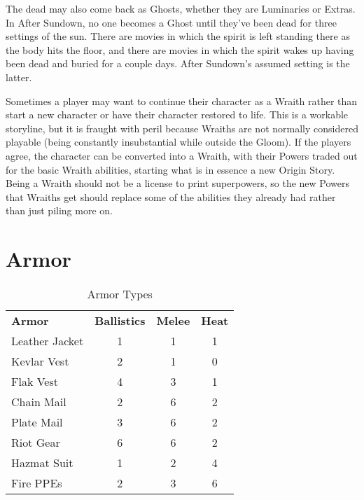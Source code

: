 The dead may also come back as Ghosts, whether they are Luminaries or Extras. In After Sundown, no one becomes a Ghost until they've been dead for three settings of the sun. There are movies in which the spirit is left standing there as the body hits the floor, and there are movies in which the spirit wakes up having been dead and buried for a couple days. After Sundown's assumed setting is the latter.

Sometimes a player may want to continue their character as a Wraith rather than start a new character or have their character restored to life. This is a workable storyline, but it is fraught with peril because Wraiths are not normally considered playable (being constantly insubstantial while outside the Gloom). If the players agree, the character can be converted into a Wraith, with their Powers traded out for the basic Wraith abilities, starting what is in essence a new Origin Story. Being a Wraith should not be a license to print superpowers, so the new Powers that Wraiths get should replace some of the abilities they already had rather than just piling more on.

\section{Armor}

\begin{wraptable}[11]{R}{7.6cm} \vspace{-.7cm}
 \caption{Armor Types} \centering
\begin{tabular}{l c c c}
\textbf{Armor} & \textbf{Ballistics} & \textbf{Melee} & \textbf{Heat}\\
Leather Jacket&1&1&1\\
Kevlar Vest&2&1&0\\
Flak Vest&4&3&1\\
Chain Mail&2&6&2\\
Plate Mail&3&6&2\\
Riot Gear&6&6&2\\
Hazmat Suit&1&2&4\\
Fire PPEs&2&3&6\\
\end{tabular}
\end{wraptable}


